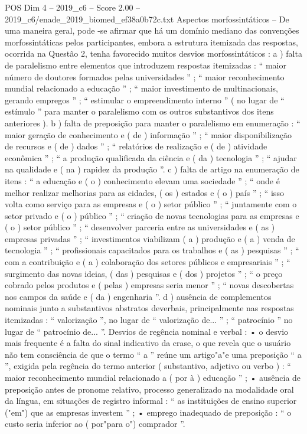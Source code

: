\begin{textsample}{POS Dim 4 – 2019\_c6 – Score 2.00 – 2019\_c6/enade\_2019\_biomed\_ef38a0b72c.txt}
Aspectos morfossintáticos – De uma maneira geral, pode -se afirmar que há um domínio mediano das convenções morfossintáticas pelos participantes, embora a estrutura itemizada das respostas, ocorrida na Questão 2, tenha favorecido muitos desvios morfossintáticos : a ) falta de paralelismo entre elementos que introduzem respostas itemizadas : “ maior número de doutores formados pelas universidades ” ; “ maior reconhecimento mundial relacionado a educação ” ; “ maior investimento de multinacionais, gerando empregos ” ; “ estimular o empreendimento interno ” ( no lugar de “ estímulo ” para manter o paralelismo com os outros substantivos dos itens anteriores ). b ) falta de preposição para manter o paralelismo em enumeração : “ maior geração de conhecimento e ( de ) informação ” ; “ maior disponibilização de recursos e ( de ) dados ” ; “ relatórios de realização e ( de ) atividade econômica ” ; “ a produção qualificada da ciência e ( da ) tecnologia ” ; “ ajudar na qualidade e ( na ) rapidez da produção ”. c ) falta de artigo na enumeração de itens : “ a educação e ( o ) conhecimento elevam uma sociedade ” ; “ onde é melhor realizar melhorias para as cidades, ( os ) estados e ( o ) país ” ; “ isso volta como serviço para as empresas e ( o ) setor público ” ; “ juntamente com o setor privado e ( o ) público ” ; “ criação de novas tecnologias para as empresas e ( o ) setor público ” ; “ desenvolver parceria entre as universidades e ( as ) empresas privadas ” ; “ investimentos viabilizam ( a ) produção e ( a ) venda de tecnologia ” ; “ profissionais capacitados para os trabalhos e ( as ) pesquisas ” ; “ com a contribuição e ( a ) colaboração dos setores públicos e empresariais ” ; “ surgimento das novas ideias, ( das ) pesquisas e ( dos ) projetos ” ; “ o preço cobrado pelos produtos e ( pelas ) empresas seria menor ” ; “ novas descobertas nos campos da saúde e ( da ) engenharia ”. d ) ausência de complementos nominais junto a substantivos abstratos deverbais, principalmente nas respostas itemizadas : “ valorização ”, no lugar de “ valorização de... ” ; “ patrocínio ” no lugar de “ patrocínio de... ”.
Desvios de regência nominal e verbal : • o desvio mais frequente é a falta do sinal indicativo da crase, o que revela que o usuário não tem consciência de que o termo “ a ” reúne um artigo"a"e uma preposição “ a ”, exigida pela regência do termo anterior ( substantivo, adjetivo ou verbo ) : “ maior reconhecimento mundial relacionado a ( por à ) educação ” ; • ausência de preposição antes de pronome relativo, processo generalizado na modalidade oral da língua, em situações de registro informal : “ as instituições de ensino superior ("em") que as empresas investem ” ; • emprego inadequado de preposição : “ o custo seria inferior ao ( por"para o") comprador ”.

\end{textsample}
